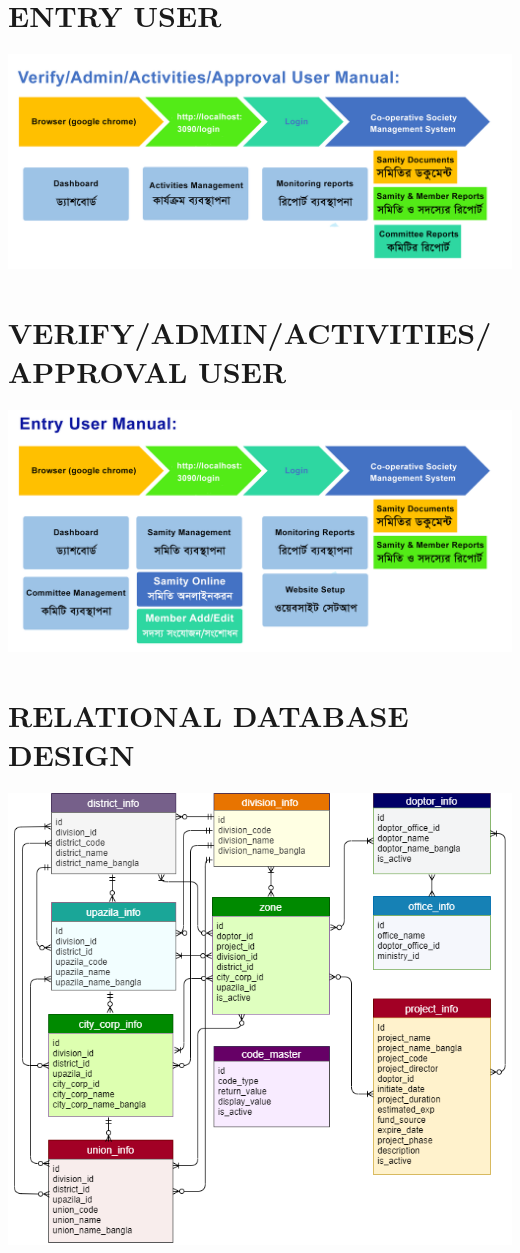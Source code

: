 \section{ENTRY USER}
  \includegraphics[width=14cm]{Chap3/4.png}

\section{VERIFY/ADMIN/ACTIVITIES/APPROVAL USER }
  \includegraphics[width=14cm]{Chap3/5.png}


\section{RELATIONAL DATABASE DESIGN}
  \includegraphics[width=14cm]{Chap3/6.png}



